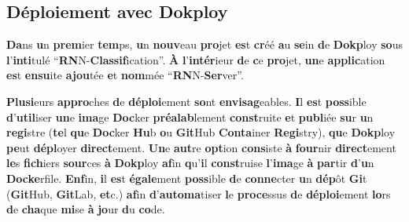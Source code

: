 \documentclass{rapportClass} %
\begin{document}


\subsection{Déploiement avec Dokploy}

\textbf{Da}ns \textbf{u}n \textbf{prem}ier \textbf{tem}ps, \textbf{u}n \textbf{nouv}eau \textbf{pro}jet \textbf{es}t \textbf{cr}éé \textbf{a}u \textbf{se}in \textbf{d}e \textbf{Dokp}loy \textbf{so}us \textbf{l}'\textbf{inti}tulé ``\textbf{RN}N-\textbf{Classif}ication''. 
\textbf{À} \textbf{l}'\textbf{intér}ieur \textbf{d}e \textbf{c}e \textbf{pro}jet, \textbf{un}e \textbf{applic}ation \textbf{es}t \textbf{ensu}ite \textbf{ajou}tée \textbf{e}t \textbf{nom}mée ``\textbf{RN}N-\textbf{Ser}ver''.

\textbf{Plusi}eurs \textbf{appro}ches \textbf{d}e \textbf{déploi}ement \textbf{so}nt \textbf{envisag}eables. \textbf{I}l \textbf{es}t \textbf{poss}ible \textbf{d}’\textbf{util}iser \textbf{un}e \textbf{ima}ge \textbf{Doc}ker \textbf{préalab}lement \textbf{const}ruite 
\textbf{e}t \textbf{publ}iée \textbf{su}r \textbf{u}n \textbf{regi}stre (\textbf{te}l \textbf{qu}e \textbf{Doc}ker \textbf{Hu}b \textbf{o}u \textbf{Git}Hub \textbf{Conta}iner \textbf{Regi}stry), \textbf{qu}e \textbf{Dokp}loy \textbf{pe}ut \textbf{dépl}oyer \textbf{direct}ement. 
\textbf{Un}e \textbf{aut}re \textbf{opt}ion \textbf{cons}iste \textbf{à} \textbf{four}nir \textbf{direct}ement \textbf{le}s \textbf{fich}iers \textbf{sour}ces \textbf{à} \textbf{Dokp}loy \textbf{af}in \textbf{q}u’\textbf{i}l \textbf{const}ruise \textbf{l}’\textbf{ima}ge \textbf{à} \textbf{par}tir \textbf{d}’\textbf{u}n \textbf{Docke}rfile. 
\textbf{Enf}in, \textbf{i}l \textbf{es}t \textbf{égale}ment \textbf{poss}ible \textbf{d}e \textbf{conne}cter \textbf{u}n \textbf{dép}ôt \textbf{Gi}t (\textbf{Git}Hub, \textbf{Git}Lab, \textbf{et}c.) \textbf{af}in \textbf{d}’\textbf{automa}tiser \textbf{l}e \textbf{proce}ssus 
\textbf{d}e \textbf{déploi}ement \textbf{lo}rs \textbf{d}e \textbf{cha}que \textbf{mi}se \textbf{à} \textbf{jo}ur \textbf{d}u \textbf{co}de.
\end{document}
